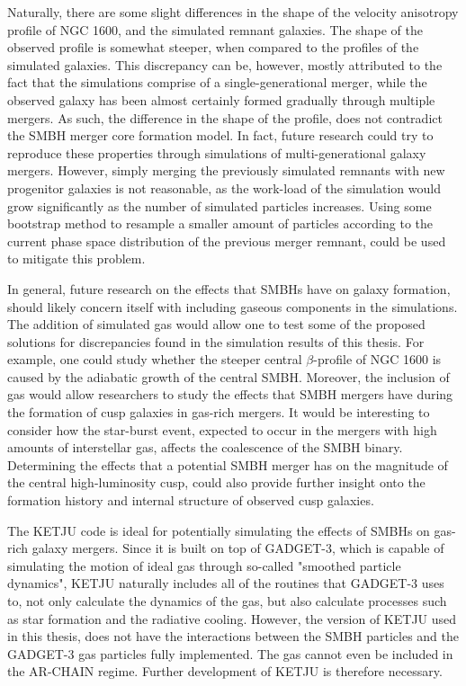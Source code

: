 \documentclass[english, twoside]{HYgradu}
\begin{document}
Naturally, there are some slight differences in the shape of the velocity anisotropy profile of NGC 1600, and the simulated remnant galaxies. The shape of the observed profile is somewhat steeper, when compared to the profiles of the simulated galaxies. This discrepancy can be, however, mostly attributed to the fact that the simulations comprise of a single-generational merger, while the observed galaxy has been almost certainly formed gradually through multiple mergers. As such, the difference in the shape of the profile, does not contradict the SMBH merger core formation model. In fact, future research could try to reproduce these properties through simulations of multi-generational galaxy mergers. However, simply merging the previously simulated remnants with new progenitor galaxies is not reasonable, as the work-load of the simulation would grow significantly as the number of simulated particles increases. Using some bootstrap method to resample a smaller amount of particles according to the current phase space distribution of the previous merger remnant, could be used to mitigate this problem.

In general, future research on the effects that SMBHs have on galaxy formation, should likely concern itself with including gaseous components in the simulations. The addition of simulated gas would allow one to test some of the proposed solutions for discrepancies found in the simulation results of this thesis. For example, one could study whether the steeper central $\beta$-profile of NGC 1600 is caused by the adiabatic growth of the central SMBH. Moreover, the inclusion of gas would allow researchers to study the effects that SMBH mergers have during the formation of cusp galaxies in gas-rich mergers. It would be interesting to consider how the star-burst event, expected to occur in the mergers with high amounts of interstellar gas, affects the coalescence of the SMBH binary. Determining the effects that a potential SMBH merger has on the magnitude of the central high-luminosity cusp, could also provide further insight onto the formation history and internal structure of observed cusp galaxies.

The KETJU code is ideal for potentially simulating the effects of SMBHs on gas-rich galaxy mergers. Since it is built on top of GADGET-3, which is capable of simulating the motion of ideal gas through so-called "smoothed particle dynamics", KETJU naturally includes all of the routines that GADGET-3 uses to, not only calculate the dynamics of the gas, but also calculate processes such as star formation and the radiative cooling. However, the version of KETJU used in this thesis, does not have the interactions between the SMBH particles and the GADGET-3 gas particles fully implemented. The gas cannot even be included in the AR-CHAIN regime. Further development of KETJU is therefore necessary.
\end{document}
